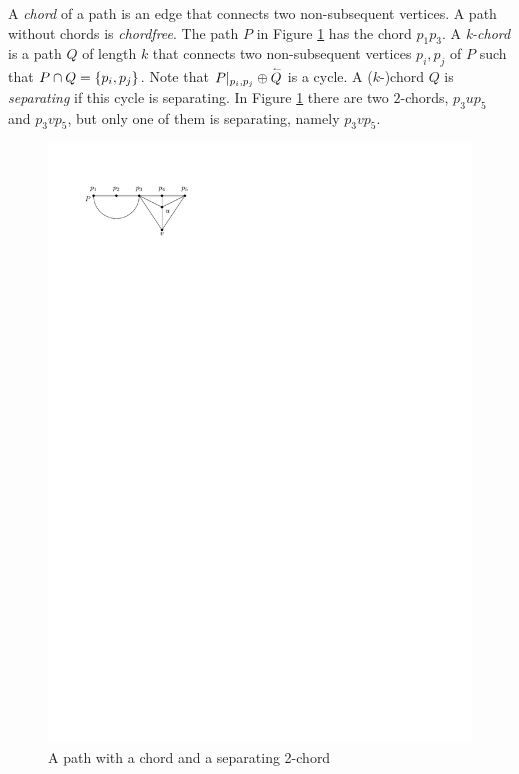     A \emph{chord} of a path is an edge that connects two non-subsequent vertices. A path without chords is \emph{chordfree}. The path $P$ in Figure \ref{fig:right:chord} has the chord $p_1 p_3$.
    A \emph{k-chord} is a path $Q$ of length $k$ that connects two non-subsequent vertices $p_i, p_j$ of $P$ such that $P \cap Q = \left\lbrace {p_i, p_j} \right\rbrace$.
    Note that $P|_{p_i, p_j} \oplus \accentset{\leftharpoonup}{Q}$ is a cycle.
    A ($k$-)chord $Q$ is \emph{separating} if this cycle is separating.
    In Figure \ref{fig:right:chord} there are two $2$-chords, $p_3 u p_5$ and $p_3 v p_5$, but only one of them is separating, namely $p_3 v p_5$.

    \begin{figure}[h]
      \centering
      \includegraphics[scale=1]{unifiedAlgo/img/rightNeighbourwalk/chords.pdf}
      \caption{A path with a chord and a separating 2-chord}
      \label{fig:right:chord}
    \end{figure}

